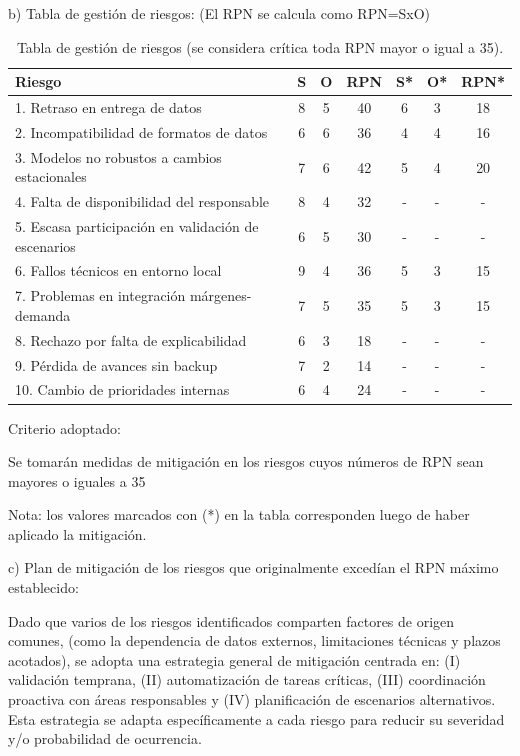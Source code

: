 \documentclass[
11pt, %
]{charter}
\begin{document}
\newpage
b) Tabla de gestión de riesgos:      (El RPN se calcula como RPN=SxO)


\begin{table}[htpb]
\centering
{}
\begin{tabular}{|p{5cm}|c|c|c|c|c|c|}
\hline
\rowcolor[HTML]{C0C0C0}
\textbf{Riesgo} & \textbf{S} & \textbf{O} & \textbf{RPN} & \textbf{S*} & \textbf{O*} & \textbf{RPN*} \\
\hline
1. Retraso en entrega de datos & 8 & 5 & \cellcolor{red!30}40 & 6 & 3 & \cellcolor{yellow!30}18 \\
2. Incompatibilidad de formatos de datos & 6 & 6 & \cellcolor{red!30}36 & 4 & 4 & \cellcolor{yellow!30}16 \\
3. Modelos no robustos a cambios estacionales & 7 & 6 & \cellcolor{red!30}42 & 5 & 4 & \cellcolor{yellow!30}20 \\
4. Falta de disponibilidad del responsable & 8 & 4 & \cellcolor{yellow!30}32 & - & - & - \\
5. Escasa participación en validación de escenarios & 6 & 5 & \cellcolor{yellow!30}30 & - & - & - \\
6. Fallos técnicos en entorno local & 9 & 4 & \cellcolor{red!30}36 & 5 & 3 & \cellcolor{yellow!30}15 \\
7. Problemas en integración márgenes-demanda & 7 & 5 & \cellcolor{red!30}35 & 5 & 3 & \cellcolor{yellow!30}15 \\
8. Rechazo por falta de explicabilidad & 6 & 3 & \cellcolor{yellow!30}18 & - & - & - \\
9. Pérdida de avances sin backup & 7 & 2 & \cellcolor{yellow!30}14 & - & - & - \\
10. Cambio de prioridades internas & 6 & 4 & \cellcolor{yellow!30}24 & - & - & - \\
\hline
\end{tabular}
\caption{Tabla de gestión de riesgos (se considera crítica toda RPN mayor o igual a 35).}
\end{table}

Criterio adoptado: 

Se tomarán medidas de mitigación en los riesgos cuyos números de RPN sean mayores o iguales a 35

Nota: los valores marcados con (*) en la tabla corresponden luego de haber aplicado la mitigación.

c) Plan de mitigación de los riesgos que originalmente excedían el RPN máximo establecido:

Dado que varios de los riesgos identificados comparten factores de origen comunes, (como la dependencia de datos externos, limitaciones técnicas y plazos acotados), se adopta una estrategia general de mitigación centrada en: (I) validación temprana, (II) automatización de tareas críticas, (III) coordinación proactiva con áreas responsables y (IV) planificación de escenarios alternativos. Esta estrategia se adapta específicamente a cada riesgo para reducir su severidad y/o probabilidad de ocurrencia.
\end{document}
